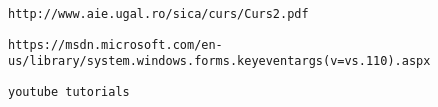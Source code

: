 
\begin{thebibliography}{99}

	\normalsize
	
	
	
	\bibitem{} {}
	\texttt{http://www.aie.ugal.ro/sica/curs/Curs2.pdf}

     \bibitem{}	{}
	 \texttt{https://msdn.microsoft.com/en-us/library/system.windows.forms.keyeventargs(v=vs.110).aspx}
	 
	 
	 \bibitem{}{}
	 \texttt{youtube tutorials}
	 
	 
\end{thebibliography}
        
